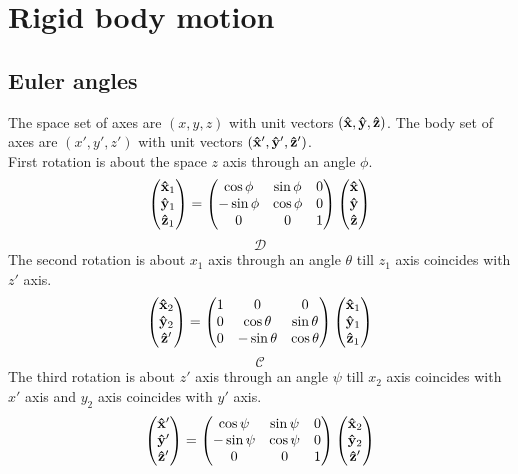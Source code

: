 \documentclass[12pt]{article}
\begin{document}
\section*{Rigid body motion}
\subsection*{Euler angles}
The space set of axes are $(x,y,z)$ with unit vectors $(\vu{x},\vu{y},\vu{z})$. The body set of axes are $(x',y',z')$ with unit vectors $(\vu{x}',\vu{y}',\vu{z}')$.\\
First rotation is about the space $z$ axis through an angle $\phi$.
\[
\begin{pmatrix}
\vu{x}_1\\ \vu{y}_1\\ \vu{z}_1
\end{pmatrix}
=
\begin{pmatrix}
\cos\phi& \sin\phi& 0\\
-\sin\phi& \cos\phi& 0\\
0& 0& 1
\end{pmatrix}
\begin{pmatrix}
\vu{x}\\ \vu{y}\\ \vu{z}
\end{pmatrix}
\]
\[\mathcal{D}\]
The second rotation is about $x_1$ axis through an angle $\theta$ till $z_1$ axis coincides with $z'$ axis.
\[
\begin{pmatrix}
\vu{x}_2\\ \vu{y}_2\\ \vu{z}'
\end{pmatrix}
=
\begin{pmatrix}
1& 0& 0 \\
0& \cos\theta& \sin\theta\\
0& -\sin\theta& \cos\theta
\end{pmatrix}
\begin{pmatrix}
\vu{x}_1\\ \vu{y}_1\\ \vu{z}_1
\end{pmatrix}
\]
\[\mathcal{C}\]
The third rotation is about $z'$ axis through an angle $\psi$ till $x_2$ axis coincides with $x'$ axis and $y_2$ axis coincides with $y'$ axis.
\[
\begin{pmatrix}
\vu{x}'\\ \vu{y}'\\ \vu{z}'
\end{pmatrix}
=
\begin{pmatrix}
\cos\psi& \sin\psi& 0 \\
-\sin\psi& \cos\psi& 0 \\
0& 0& 1
\end{pmatrix}
\begin{pmatrix}
\vu{x}_2\\ \vu{y}_2\\ \vu{z}'
\end{pmatrix}
\]
\end{document}
